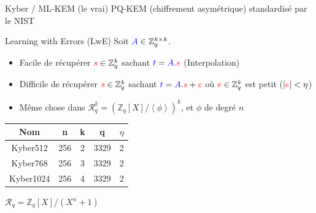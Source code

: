 \begin{frame}{Kyber / ML-KEM (le vrai)}
PQ-KEM (chiffrement asymétrique) standardisé par le NIST
\pause
   \begin{block}{Learning with Errors (LwE)}
   Soit $\textcolor{blue}{A}\in\mathbb{Z}_q^{k\times k}$.
       \begin{itemize}
        \item Facile de récupérer $\textcolor{red}{s}\in\mathbb{Z}_q^k$ sachant $\textcolor{blue}{t}=\textcolor{blue}{A}.\textcolor{red}{s}$ (Interpolation)
        \pause
        \item Difficile  de récupérer $\textcolor{red}{s}\in\mathbb{Z}_q^k$ sachant $\textcolor{blue}{t}=\textcolor{blue}{A}.\textcolor{red}{s}+\textcolor{red}{e}$ où $\textcolor{red}{e}\in\mathbb{Z}_q^{k}$ est petit ($|\textcolor{red}{e}|<\eta$)
        \pause 
        \item Même chose dans $\mathcal{R}_q^k = \left(\mathbb{Z}_q[X]/\left<\phi\right>\right)^k$, et $\phi$ de degré $n$
       \end{itemize}
   \end{block}
   \pause
   \begin{table}
        \begin{tabular}{c|c|c|c|c}
            Nom       & n   & k & q    & $\eta$ \\
            \hline
            Kyber512  & 256 & 2 & 3329 & 2\\
            Kyber768  & 256 & 3 & 3329 & 2\\
            Kyber1024 & 256 & 4 & 3329 & 2\\
        \end{tabular}
    \end{table}
    \pause 
    $\mathcal{R}_q = \mathbb{Z}_q[X]/(X^n+1)$
\end{frame}

